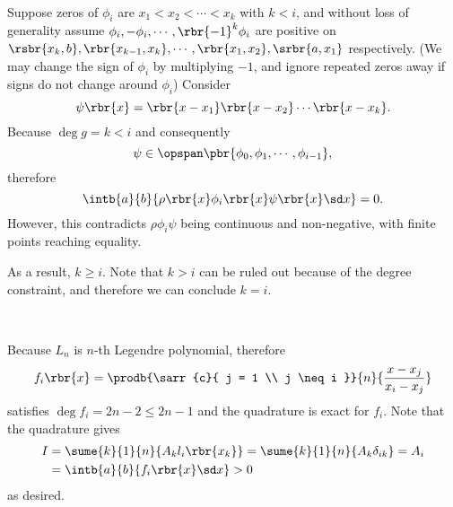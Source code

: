 \documentclass[english, nochinese]{../textmpls/pkupaper}
\begin{document}
\begin{thmquestion}
\ 
\begin{thmproof}
Suppose zeros of $\phi_i$ are $ x_1 < x_2 < \cdots < x_k $ with $ k < i $, and without loss of generality assume $ \phi_i, -\phi_i, \cdots, \rbr{-1}^k \phi_i $ are positive on $ \rsbr{ x_k, b }, \rbr{ x_{ k - 1 }, x_k }, \cdots, \rbr{ x_1, x_2 }, \srbr{ a , x_1 } $ respectively. (We may change the sign of $\phi_i$ by multiplying $-1$, and ignore repeated zeros away if signs do not change around $\phi_i$) Consider
\begin{equation}
\psi \rbr{x} = \rbr{ x - x_1 } \rbr{ x - x_2 } \cdots \rbr{ x - x_k }.
\end{equation}
Because $ \deg g = k < i $ and consequently
\begin{equation}
\psi \in \opspan \pbr{ \phi_0, \phi_1, \cdots, \phi_{ i - 1 } },
\end{equation}
therefore
\begin{equation}
\intb{a}{b}{ \rho \rbr{x} \phi_i \rbr{x} \psi \rbr{x} \sd x } = 0.
\end{equation}
However, this contradicts $ \rho \phi_i \psi $ being continuous and non-negative, with finite points reaching equality.

As a result, $ k \ge i $. Note that $ k > i $ can be ruled out because of the degree constraint, and therefore we can conclude $ k = i $.

\sqed
\end{thmproof}
\end{thmquestion}

\begin{thmquestion}
\ 
\begin{thmproof}
Because $L_n$ is $n$-th Legendre polynomial, therefore
\begin{equation}
f_i \rbr{x} = \prodb{\sarr{c}{ j = 1 \\ j \neq i }}{n}{\frac{ x - x_j }{ x_i - x_j }}
\end{equation}
satisfies $ \deg f_i = 2 n - 2 \le 2 n - 1 $ and the quadrature is exact for $f_i$. Note that the quadrature gives
\begin{equation}
\begin{split}
I &= \sume{k}{1}{n}{ A_k l_i \rbr{x_k}} = \sume{k}{1}{n}{ A_k \delta_{ i k } } = A_i \\
&= \intb{a}{b}{ f_i \rbr{x} \sd x } > 0
\end{split}
\end{equation}
as desired.

\sqed
\end{thmproof}
\end{thmquestion}
\end{document}
